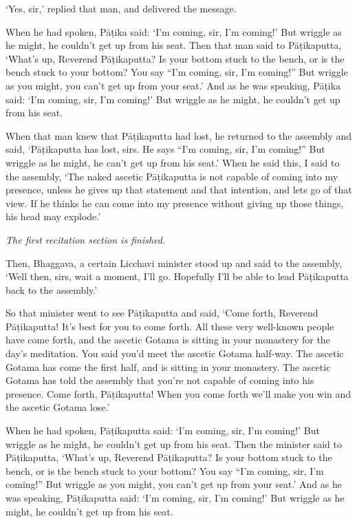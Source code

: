 \documentclass[12pt,openany]{book}%
\newcommand*{\scendsection}[1]{\begin{center}\textit{#1}\end{center}}
\begin{document}
‘Yes, sir,’ replied that man, and delivered the message. 

When he had spoken, \textsanskrit{Pāṭika} said: ‘I’m coming, sir, I’m coming!’ But wriggle as he might, he couldn’t get up from his seat. Then that man said to \textsanskrit{Pāṭikaputta}, ‘What’s up, Reverend \textsanskrit{Pāṭikaputta}? Is your bottom stuck to the bench, or is the bench stuck to your bottom? You say “I’m coming, sir, I’m coming!” But wriggle as you might, you can’t get up from your seat.’ And as he was speaking, \textsanskrit{Pāṭika} said: ‘I’m coming, sir, I’m coming!’ But wriggle as he might, he couldn’t get up from his seat. 

When that man knew that \textsanskrit{Pāṭikaputta} had lost, he returned to the assembly and said, ‘\textsanskrit{Pāṭikaputta} has lost, sirs. He says “I’m coming, sir, I’m coming!” But wriggle as he might, he can’t get up from his seat.’ When he said this, I said to the assembly, ‘The naked ascetic \textsanskrit{Pāṭikaputta} is not capable of coming into my presence, unless he gives up that statement and that intention, and lets go of that view. If he thinks he can come into my presence without giving up those things, his head may explode.’ 

\scendsection{The first recitation section is finished. }

Then, Bhaggava, a certain Licchavi minister stood up and said to the assembly, ‘Well then, sirs, wait a moment, I’ll go. Hopefully I’ll be able to lead \textsanskrit{Pāṭikaputta} back to the assembly.’ 

So that minister went to see \textsanskrit{Pāṭikaputta} and said, ‘Come forth, Reverend \textsanskrit{Pāṭikaputta}! It’s best for you to come forth. All these very well-known people have come forth, and the ascetic Gotama is sitting in your monastery for the day’s meditation. You said you’d meet the ascetic Gotama half-way. The ascetic Gotama has come the first half, and is sitting in your monastery. The ascetic Gotama has told the assembly that you’re not capable of coming into his presence. Come forth, \textsanskrit{Pāṭikaputta}! When you come forth we’ll make you win and the ascetic Gotama lose.’ 

When he had spoken, \textsanskrit{Pāṭikaputta} said: ‘I’m coming, sir, I’m coming!’ But wriggle as he might, he couldn’t get up from his seat. Then the minister said to \textsanskrit{Pāṭikaputta}, ‘What’s up, Reverend \textsanskrit{Pāṭikaputta}? Is your bottom stuck to the bench, or is the bench stuck to your bottom? You say “I’m coming, sir, I’m coming!” But wriggle as you might, you can’t get up from your seat.’ And as he was speaking, \textsanskrit{Pāṭikaputta} said: ‘I’m coming, sir, I’m coming!’ But wriggle as he might, he couldn’t get up from his seat. 
\end{document}

